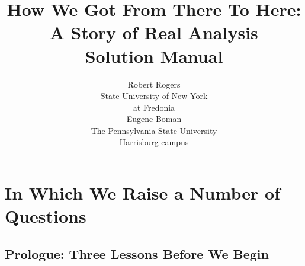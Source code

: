\documentclass[oneside]{book}
\begin{document}
\title{{\sc How We Got From There To Here:\\} A Story of Real
  Analysis\\ Solution Manual }
\author{Robert Rogers \\State University of New York \\at
  Fredonia\\[5mm]Eugene Boman \\The Pennsylvania State University \\Harrisburg campus}
\date{}
\maketitle
\newpage{}
\tableofcontents{}

\part{In Which We Raise a Number of Questions}
\chapter*{Prologue: Three Lessons Before We Begin}
\label{sec:two-lessons-before}


\pagestyle{myheadings}
\end{document}
